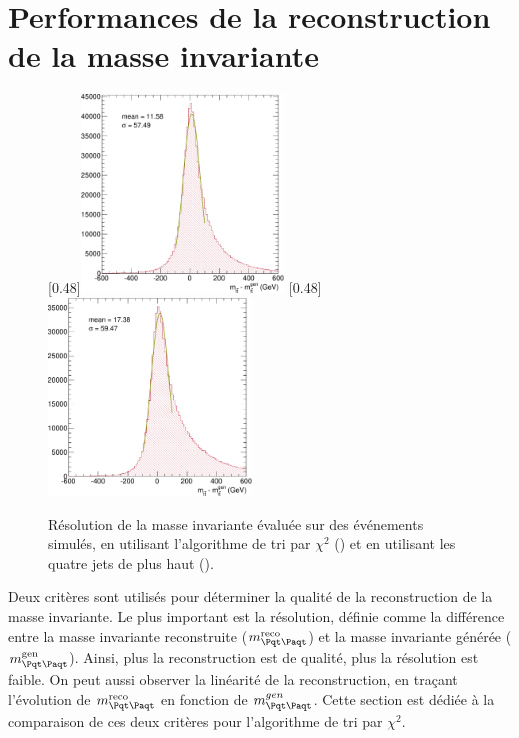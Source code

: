\section{Performances de la reconstruction de la masse invariante} \label{sec:perf_reco_tt}

\begin{figure}[tbp] \centering
    \subcaptionbox{\label{fig:mtt_reso_chi2}}[0.48\textwidth]{\includegraphics[width=0.48\textwidth]{chapitre6/figs/mtt_resolution_chi2.pdf}} \hfill
    \subcaptionbox{\label{fig:mtt_reso_four_jets}}[0.48\textwidth]{\includegraphics[width=0.48\textwidth]{chapitre6/figs/mtt_resolution_four_jets.pdf}}
    \caption{Résolution de la masse invariante \mtt évaluée sur des événements \ttbar simulés, en utilisant l'algorithme de tri par $\chi^2$ () et en utilisant les quatre jets de plus haut \pt ().}
\end{figure}

Deux critères sont utilisés pour déterminer la qualité de la reconstruction de la masse invariante. Le plus important est la résolution, définie comme la différence entre la masse invariante reconstruite ($\mtt^\text{reco}$) et la masse invariante générée ($\mtt^\text{gen}$). Ainsi, plus la reconstruction est de qualité, plus la résolution est faible. On peut aussi observer la linéarité de la reconstruction, en traçant l'évolution de $\mtt^\text{reco}$ en fonction de $\mtt^{gen}$. Cette section est dédiée à la comparaison de ces deux critères pour l'algorithme de tri par $\chi^2$.


